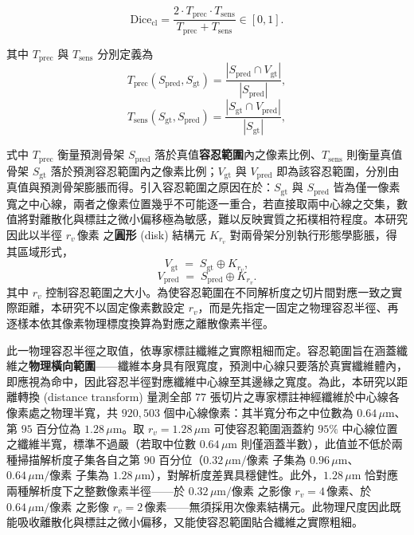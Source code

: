 \begin{equation}
  \text{Dice}_{\text{cl}} = \frac{2 \cdot T_{\text{prec}} \cdot T_{\text{sens}}}{T_{\text{prec}} + T_{\text{sens}}} \in [0, 1].
  \label{eq:cldice}
\end{equation}

\noindent 其中 $T_{\text{prec}}$ 與 $T_{\text{sens}}$ 分別定義為
\begin{equation}
  T_{\text{prec}}(S_{\text{pred}}, S_{\text{gt}}) = \frac{|S_{\text{pred}} \cap V_{\text{gt}}|}{|S_{\text{pred}}|},
  \label{eq:clprec}
\end{equation}
\begin{equation}
  T_{\text{sens}}(S_{\text{gt}}, S_{\text{pred}}) = \frac{|S_{\text{gt}} \cap V_{\text{pred}}|}{|S_{\text{gt}}|},
  \label{eq:clsens}
\end{equation}

\noindent 式中 $T_{\text{prec}}$ 衡量預測骨架 $S_{\text{pred}}$ 落於真值\textbf{容忍範圍}內之像素比例、$T_{\text{sens}}$ 則衡量真值骨架 $S_{\text{gt}}$ 落於預測容忍範圍內之像素比例；$V_{\text{gt}}$ 與 $V_{\text{pred}}$ 即為該容忍範圍，分別由真值與預測骨架膨脹而得。引入容忍範圍之原因在於：$S_{\text{gt}}$ 與 $S_{\text{pred}}$ 皆為僅一像素寬之中心線，兩者之像素位置幾乎不可能逐一重合，若直接取兩中心線之交集，數值將對離散化與標註之微小偏移極為敏感，難以反映實質之拓樸相符程度。本研究因此以半徑 $r_v\,\text{像素}$ 之\textbf{圓形} (disk) 結構元 $K_{r_v}$ 對兩骨架分別執行形態學膨脹，得其區域形式，
\begin{equation}
  V_{\text{gt}} \;=\; S_{\text{gt}} \oplus K_{r_v},
  \label{eq:vgt}
\end{equation}
\begin{equation}
  V_{\text{pred}} \;=\; S_{\text{pred}} \oplus K_{r_v}.
  \label{eq:vpred}
\end{equation}
\noindent 其中 $r_v$ 控制容忍範圍之大小。為使容忍範圍在不同解析度之切片間對應一致之實際距離，本研究不以固定像素數設定 $r_v$，而是先指定一固定之物理容忍半徑、再逐樣本依其像素物理標度換算為對應之離散像素半徑。

此一物理容忍半徑之取值，依專家標註纖維之實際粗細而定。容忍範圍旨在涵蓋纖維之\textbf{物理橫向範圍}——纖維本身具有限寬度，預測中心線只要落於真實纖維體內，即應視為命中，因此容忍半徑對應纖維中心線至其邊緣之寬度。為此，本研究以距離轉換 (distance transform) 量測全部 $77$ 張切片之專家標註神經纖維於中心線各像素處之物理半寬，共 $920{,}503$ 個中心線像素：其半寬分布之中位數為 $0.64\,\mu\text{m}$、第 $95$ 百分位為 $1.28\,\mu\text{m}$。取 $r_v = 1.28\,\mu\text{m}$ 可使容忍範圍涵蓋約 $95\%$ 中心線位置之纖維半寬，標準不過嚴（若取中位數 $0.64\,\mu\text{m}$ 則僅涵蓋半數），此值並不低於兩種掃描解析度子集各自之第 $90$ 百分位（$0.32\,\mu\text{m/像素}$ 子集為 $0.96\,\mu\text{m}$、$0.64\,\mu\text{m/像素}$ 子集為 $1.28\,\mu\text{m}$），對解析度差異具穩健性。此外，$1.28\,\mu\text{m}$ 恰對應兩種解析度下之整數像素半徑——於 $0.32\,\mu\text{m/像素}$ 之影像 $r_v = 4\,\text{像素}$、於 $0.64\,\mu\text{m/像素}$ 之影像 $r_v = 2\,\text{像素}$——無須採用次像素結構元。此物理尺度因此既能吸收離散化與標註之微小偏移，又能使容忍範圍貼合纖維之實際粗細。

